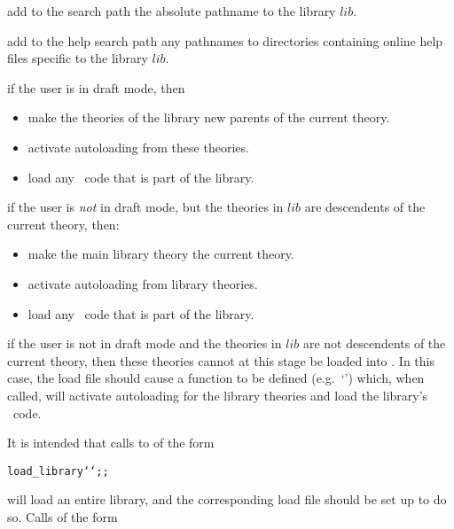 \begin{myenumerate}
\item add to the search path the absolute pathname to the library $lib$.

\item add to the help search path any pathnames to directories containing
online help files specific to the library $lib$.

\item if the user is in draft mode, then

\begin{itemize}
    \item make the theories of the library new parents of the current theory.
    \item activate autoloading from these theories.
    \item load any \ML\ code that is part of the library.
\end{itemize}

\item if the user is {\it not\/} in draft mode, but the theories in $lib$ are
descendents of the current theory, then:

\begin{itemize}
    \item make the main library theory the current theory.
    \item activate autoloading from library theories.
    \item load any \ML\ code that is part of the library.
\end{itemize}

\item if the user is not in draft mode and the theories in $lib$ are not
descendents of the current theory, then these theories cannot at this stage be
loaded into \HOL. In this case, the load file should cause a function to be
defined (e.g.\ `') which, when called, will activate
autoloading for the library theories and load the library's \ML\ code.

\end{myenumerate}

\noindent It is intended that calls to  of the form

\begin{hol}\begin{alltt}
   load_library ``;;
\end{alltt}\end{hol}

\noindent will load an entire library, and the corresponding load file
 should be set up to do so.  Calls of the form

